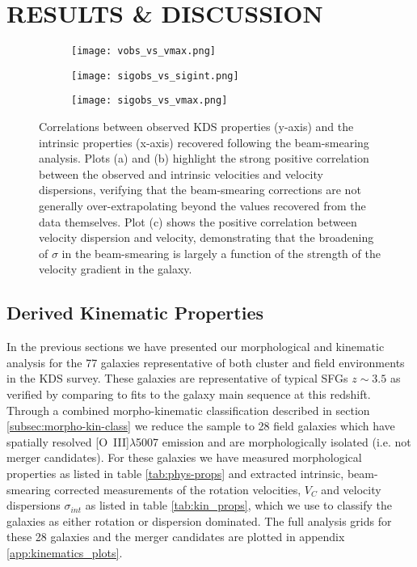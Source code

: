 \documentclass[fleqn,usenatbib]{mn2e}
\begin{document}
\section{RESULTS \& DISCUSSION}\label{sec:results}

\begin{figure*}
    \centering
    \begin{subfigure}[h!]{0.32\textwidth}
        \centering
        \texttt{[image: vobs\_vs\_vmax.png]}
    \end{subfigure}%
    \begin{subfigure}[h!]{0.32\textwidth}
        \centering
        \texttt{[image: sigobs\_vs\_sigint.png]}
    \end{subfigure}
    \begin{subfigure}[h!]{0.32\textwidth}
        \centering
        \texttt{[image: sigobs\_vs\_vmax.png]}
    \end{subfigure}
    \caption{Correlations between observed KDS properties (y-axis) and the intrinsic properties (x-axis) recovered following the beam-smearing analysis.
    Plots (a) and (b) highlight the strong positive correlation between the observed and intrinsic velocities and velocity dispersions, verifying that the beam-smearing corrections are not generally over-extrapolating beyond the values recovered from the data themselves.
    Plot (c) shows the positive correlation between velocity dispersion and velocity, demonstrating that the broadening of $\sigma$ in the beam-smearing is largely a function of the strength of the velocity gradient in the galaxy.}
    \label{fig:observed_and_intrinsic}
\end{figure*}

\subsection{Derived Kinematic Properties}
In the previous sections we have presented our morphological and kinematic analysis for the 77 galaxies representative of both cluster and field environments in the KDS survey.
These galaxies are representative of typical SFGs $z\sim3.5$ as verified by comparing to fits to the galaxy main sequence at this redshift.
Through a combined morpho-kinematic classification described in section \cref{subsec:morpho-kin-class} we reduce the sample to 28 field galaxies which have spatially resolved [O~{\sc III}]$\lambda$5007 emission and are morphologically isolated (i.e. not merger candidates).
For these galaxies we have measured morphological properties as listed in table \ref{tab:phys-props} and extracted intrinsic, beam-smearing corrected measurements of the rotation velocities, $V_{C}$ and velocity dispersions $\sigma_{int}$ as listed in table \ref{tab:kin_props}, which we use to classify the galaxies as either rotation or dispersion dominated.
The full analysis grids for these 28 galaxies and the merger candidates are plotted in appendix \cref{app:kinematics_plots}.   
\end{document}
